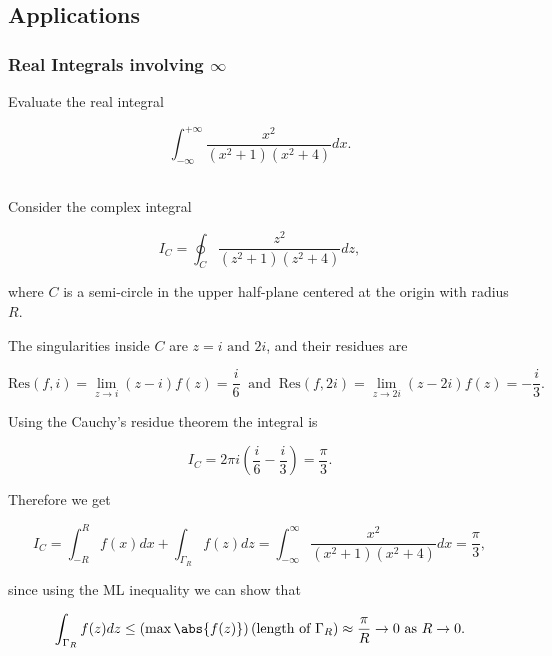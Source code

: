 \documentclass[english,a4paper,12pt]{report}
\begin{document}
\subsection{Applications}

\subsubsection{Real Integrals involving \(\infty\) }

{Evaluate the real integral 

\begin{equation}
    \int_{-\infty}^{+\infty} \frac{x^2}{(x^2+1)(x^2+4)}dx.  
\end{equation}
~
}
{Consider the complex integral 

\begin{equation}
    I_{C} = \oint_{C} \frac{z^2}{(z^2+1)(z^2+4)}dz, 
\end{equation}

where \(C\) is a semi-circle in the upper half-plane centered at the origin with radius \(R\).

The singularities inside \(C\) are \(z = i \text { and } 2i\), and their residues are 

\begin{equation}
    \text{Res}(f,i) = \lim_{z \to i} (z-i)f(z)=  \frac{i}{6} ~\text { and }~ \text{Res}(f,2i) = \lim_{z \to 2i} (z-2i)f(z) = -\frac{i}{3}.   
\end{equation}

Using the Cauchy's residue theorem the integral is

\begin{equation}
    I_{C} = 2\pi i \left( \frac{i}{6} - \frac{i}{3}   \right) = \frac{\pi }{3}. 
\end{equation}

Therefore we get 

\begin{equation}
    I_{C} = \int_{-R}^{R} f(x)dx + \int_{\Gamma _{R} }^{}f(z)dz  = \int_{-\infty}^{\infty} \frac{x^2}{(x^2+1)(x^2+4)}dx = \frac{\pi }{3},    
\end{equation}

since using the ML inequality we can show that 

\begin{equation}
    \int_{\Gamma _{R} }^{} f(z)dz \le \left( \max \abs{f(z)}  \right) (\text{length of }\Gamma _{R}  ) \approx \frac{\pi }{R} \to 0 \text{ as } R \to 0.  
\end{equation}
~
} 
\end{document}
